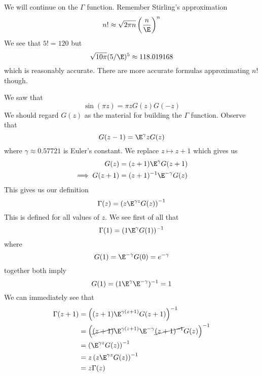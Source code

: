 
We will continue on the $\Gamma$ function. Remember Stirling's
approximation
\begin{equation}
n!\approx\sqrt{2\pi n}\left(\frac{n}{\E}\right)^{n}
\end{equation}
We see that $5!=120$ but
\begin{equation}
\sqrt{10\pi}(5/\E)^{5}\approx 118.019168
\end{equation}
which is reasonably accurate. There are more accurate formulas
approximating $n!$ though.

We saw that
\begin{equation}
\sin(\pi z)=\pi zG(z)G(-z)
\end{equation}
We should regard $G(z)$ as the material for building the $\Gamma$
function. Observe that
\begin{equation}
G(z-1)=\E^{\gamma}zG(z)
\end{equation}
where $\gamma\approx 0.57721$ is Euler's constant.
We replace $z\mapsto z+1$ which gives us
\begin{equation}
\begin{split}
G(z) &= (z+1)\E^{\gamma}G(z+1)\\
\implies G(z+1) &= (z+1)^{-1}\E^{-\gamma}G(z)
\end{split}
\end{equation}
This gives us our definition
\begin{equation}
\Gamma(z)=\left(z\E^{\gamma z}G(z)\right)^{-1}
\end{equation}
This is defined for all values of $z$. We see first of all that
\begin{equation}
\Gamma(1)=(1\E^{\gamma}G(1))^{-1}
\end{equation}
where
\begin{equation}
G(1) = \E^{-\gamma}G(0)=e^{-\gamma}
\end{equation}
together both imply
\begin{equation}
G(1)=(1\E^{\gamma}\E^{-\gamma})^{-1}=1
\end{equation}
We can immediately see that
\begin{subequations}
\begin{align}
\Gamma(z+1) &= \left((z+1)\E^{\gamma(z+1)}G(z+1)\right)^{-1}\\
&=\left(\cancel{(z+1)}\E^{\gamma(z+1)}\E^{-\gamma}\cancel{(z+1)^{-1}}G(z)\right)^{-1}\\
&=\left(\E^{\gamma z}G(z)\right)^{-1}\\
&=z\left(z\E^{\gamma z}G(z)\right)^{-1}\\
&=z\Gamma(z)
\end{align}
\end{subequations}
